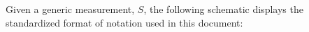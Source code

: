 \documentclass[12pt]{article}\usepackage[]{graphicx}\usepackage[]{color}
\begin{document}
Given a generic measurement, $S$, the following schematic displays the standardized format of notation used in this document: 

\end{document}
